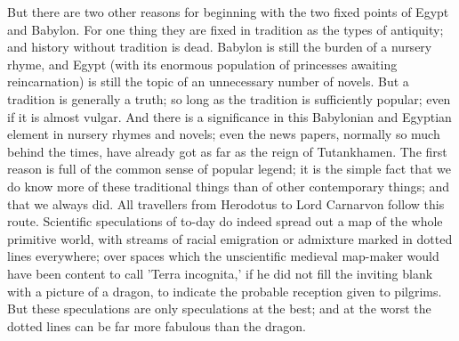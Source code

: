 But there are two other reasons for beginning with the two fixed points of Egypt and Babylon. For one thing they are fixed in tradition as the types of antiquity; and history without tradition is dead. Babylon is still the burden of a nursery rhyme, and Egypt (with its enormous population of princesses awaiting reincarnation) is still the topic of an unnecessary number of novels. But a tradition is generally a truth; so long as the tradition is sufficiently popular; even if it is almost vulgar. And there is a significance in this Babylonian and Egyptian element in nursery rhymes and novels; even the news papers, normally so much behind the times, have already got as far as the reign of Tutankhamen. The first reason is full of the common sense of popular legend; it is the simple fact that we do know more of these traditional things than of other contemporary things; and that we always did. All travellers from Herodotus to Lord Carnarvon follow this route. Scientific speculations of to-day do indeed spread out a map of the whole primitive world, with streams of racial emigration or admixture marked in dotted lines everywhere; over spaces which the unscientific medieval map-maker would have been content to call 'Terra incognita,' if he did not fill the inviting blank with a picture of a dragon, to indicate the probable reception given to pilgrims. But these speculations are only speculations at the best; and at the worst the dotted lines can be far more fabulous than the dragon.

